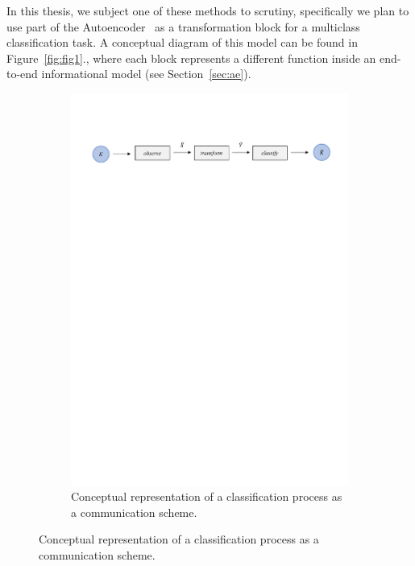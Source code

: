 In this thesis, we subject one of these methods to scrutiny, specifically we plan to use part of the Autoencoder~\cite{mur:12}  as a transformation block for a multiclass classification task. 
%
A conceptual diagram of this model can be found in Figure~\ref{fig:fig1}., where each block represents a different function inside an end-to-end informational model (see Section~\ref{sec:ae}).
%
\begin{figure}[H]
	\begin{subfigure}{1\textwidth}  
		\centering
		\includegraphics[width=16cm]{Figuras_tfg/Figura1_tfg}
		\caption{Conceptual representation of a classification process as a communication scheme.}
		\label{fig:fig1b} 
	\end{subfigure}%
	

\end{figure}
